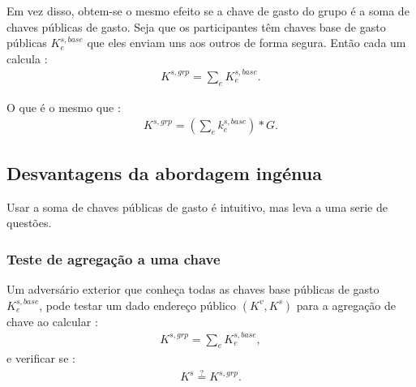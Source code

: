 Em vez disso, obtem-se o mesmo efeito se a chave de gasto do grupo é a soma de chaves públicas de gasto.
Seja que os participantes têm chaves base de gasto públicas $K^{s,base}_e$ que eles enviam uns aos outros de forma segura. Então cada um calcula : 
\begin{align*}
K^{s,grp} = \sum_e K^{s,base}_e .
\end{align*}


O que é o mesmo que :
\begin{align*}
K^{s,grp} = (\sum_e k^{s,base}_e)*G .
\end{align*}

\subsection{Desvantagens da abordagem ingénua}
\label{subsec:drawbacks-naive-aggregation-cancellation}

Usar a soma de chaves públicas de gasto é intuitivo, mas leva a uma serie de questões.

\subsubsection*{Teste de agregação a uma chave}
Um adversário exterior que conheça todas as chaves base públicas de gasto $K^{s,base}_e$,
pode testar um dado endereço público $(K^v,K^s)$ para a agregação de chave ao calcular :
\begin{align*}
K^{s,grp} = \sum_e K^{s,base}_e ,
\end{align*}
e verificar se :
\begin{align*}
K^s \stackrel{?}{=} K^{s,grp} .
\end{align*}


